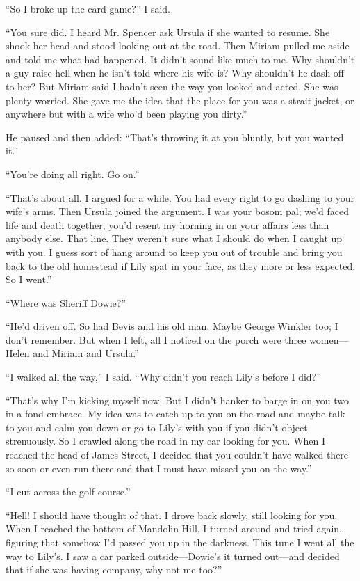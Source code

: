 {“So I broke up the card game?” I said.

“You sure did. I heard Mr. Spencer ask Ursula if she wanted to resume. She shook her head and stood looking out at the road. Then Miriam pulled me aside and told me what had happened. It didn’t sound like much to me. Why shouldn’t a guy raise hell when he isn’t told where his wife is? Why shouldn’t he dash off to her? But Miriam said I hadn’t seen the way you looked and acted. She was plenty worried. She gave me the idea that the place for you was a strait jacket, or anywhere but with a wife who’d been playing you dirty.”

He paused and then added: “That’s throwing it at you bluntly, but you wanted it.”

“You’re doing all right. Go on.”

“That’s about all. I argued for a while. You had every right to go dashing to your wife’s arms. Then Ursula joined the argument. I was your bosom pal; we’d faced life and death together; you’d resent my horning in on your affairs less than anybody else. That line. They weren’t sure what I should do when I caught up with you. I guess sort of hang around to keep you out of trouble and bring you back to the old homestead if Lily spat in your face, as they more or less expected. So I went.”

“Where was Sheriff Dowie?”

“He’d driven off. So had Bevis and his old man. Maybe George Winkler too; I don’t remember. But when I left, all I noticed on the porch were three women—Helen and Miriam and Ursula.”

“I walked all the way,” I said. “Why didn’t you reach Lily’s before I did?”

“That’s why I’m kicking myself now. But I didn’t hanker to barge in on you two in a fond embrace. My idea was to catch up to you on the road and maybe talk to you and calm you down or go to Lily’s with you if you didn’t object strenuously. So I crawled along the road in my car looking for you. When I reached the head of James Street, I decided that you couldn’t have walked there so soon or even run there and that I must have missed you on the way.”

“I cut across the golf course.”

“Hell! I should have thought of that. I drove back slowly, still looking for you. When I reached the bottom of Mandolin Hill, I turned around and tried again, figuring that somehow I’d passed you up in the darkness. This tune I went all the way to Lily’s. I saw a car parked outside—Dowie’s it turned out—and decided that if she was having company, why not me too?”

}
